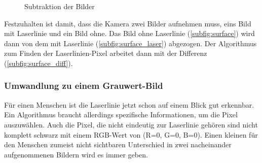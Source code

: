 	\begin{figure}[h]
		\centering
		\caption{Subtraktion der Bilder}
		\label{fig:sub_imgs}
	\end{figure} 
	
	Festzuhalten ist damit, dass die Kamera zwei Bilder aufnehmen muss, eins Bild mit Laserlinie und ein Bild ohne. Das Bild ohne Laserlinie (\ref{subfig:surface}) wird dann von dem mit Laserlinie (\ref{subfig:surface_laser}) abgezogen. Der Algorithmus zum Finden der Laserlinien-Pixel arbeitet dann mit der Differenz (\ref{subfig:surface_diff}).
	
	\newpage
	
	\subsubsection{Umwandlung zu einem Grauwert-Bild}
	Für einen Menschen ist die Laserlinie jetzt schon auf einem Blick gut erkennbar. Ein Algorithmus braucht allerdings spezifische Informationen, um die Pixel auszuwählen. Auch die Pixel, die nicht eindeutig zur Laserlinie gehören sind nicht komplett schwarz mit einem RGB-Wert von (R=0, G=0, B=0). Einen kleinen für den Menschen zumeist nicht sichtbaren Unterschied in zwei nacheinander aufgenommenen Bildern wird es immer geben. 
	
